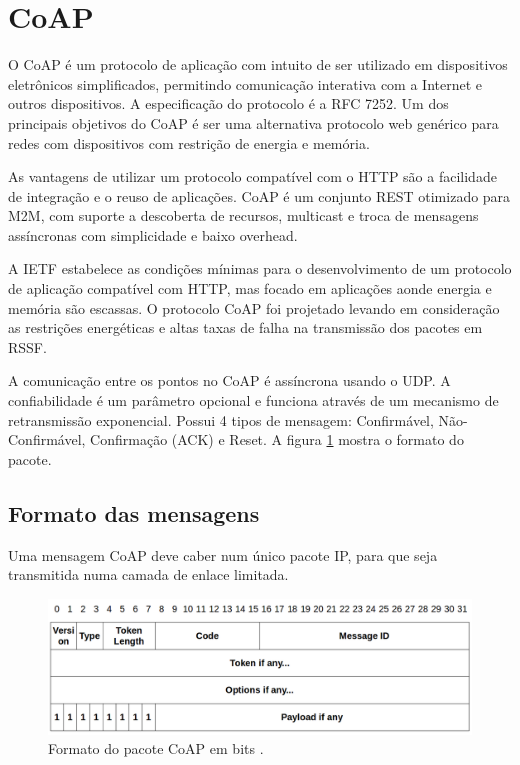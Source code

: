 \section{CoAP}

O CoAP \'e um protocolo de aplica\c{c}\~ao com intuito de ser utilizado em dispositivos eletr\^onicos simplificados, permitindo comunica\c{c}\~ao interativa com a Internet e outros dispositivos. A especifica\c{c}\~ao do protocolo \'e a RFC 7252. Um dos principais objetivos do CoAP \'e ser uma alternativa protocolo web gen\'erico para redes com dispositivos com restri\c{c}\~ao de energia e mem\'oria.

As vantagens de utilizar um protocolo compat\'ivel com o HTTP s\~ao a facilidade de integra\c{c}\~ao e o reuso de aplica\c{c}\~oes. CoAP \'e um conjunto REST otimizado para M2M, com suporte a descoberta de recursos, multicast e troca de mensagens ass\'incronas com simplicidade e baixo overhead.

A IETF estabelece as condi\c{c}\~oes m\'inimas para o desenvolvimento de um protocolo de aplica\c{c}\~ao compat\'ivel com HTTP, mas focado em aplica\c{c}\~oes aonde energia e mem\'oria s\~ao escassas. O protocolo CoAP foi projetado levando em considera\c{c}\~ao as restri\c{c}\~oes energ\'eticas e altas taxas de falha na transmiss\~ao dos pacotes em RSSF.

A comunica\c{c}\~ao entre os pontos no CoAP \'e ass\'incrona usando o UDP. A confiabilidade \'e um par\^ametro opcional e funciona atrav\'es de um mecanismo de retransmiss\~ao exponencial. Possui 4 tipos de mensagem: Confirm\'avel, N\~ao-Confirm\'avel, Confirma\c{c}\~ao (ACK) e Reset. A figura \ref{coapFormat} mostra o formato do pacote.

\subsection{Formato das mensagens}
Uma mensagem CoAP deve caber num \'unico pacote IP, para que seja transmitida numa camada de enlace limitada.
\begin{figure}[H]
    \centering
    \includegraphics[width=1.0\textwidth]{figuras/formato.png}
    \caption{Formato do pacote CoAP  em bits \cite{draft-ietf-core-coap-18}.}
    \label{coapFormat}
\end{figure}



